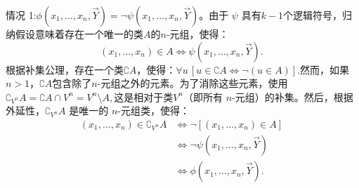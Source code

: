 情况 1:\(\phi(x_1, \dots, x_n, \vec{Y}) = \neg \psi(x_1, \dots, x_n,\vec{Y})\)。由于 \(\psi\) 具有\(k - 1\)个逻辑符号，归纳假设意味着存在一个唯一的类\(A\)的\(n\)-元组，使得：
\[
(x_1, \dots, x_n) \in A \iff \psi(x_1, \dots, x_n, \vec{Y}).~
\]
根据补集公理，存在一个类\(\complement A\)，使得：\(\forall u \, [u \in \complement A\iff \neg(u \in A)]\).然而，如果\(n > 1\)，\(\complement A\)包含除了\(n\)-元组之外的元素。为了消除这些元素，使用\(\complement_{V^n} A = \complement A \cap V^n = V^n \setminus A,
\)这是相对于类\(V^n\)（即所有 \(n\)-元组）的补集。然后，根据外延性，\(\complement_{V^n} A\) 是唯一的 \(n\)-元组类，使得：
\[
\begin{aligned}
(x_1, \dots, x_n) \in \complement_{V^n} A &\iff \neg [(x_1, \dots, x_n) \in A]\\
&\iff \neg \psi(x_1, \dots, x_n, \vec{Y})\\
&\iff \phi(x_1, \dots, x_n, \vec{Y}).
\end{aligned}~
\]
